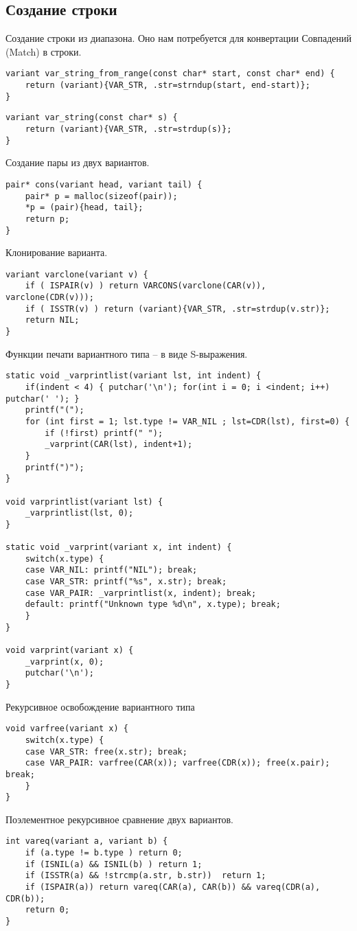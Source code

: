 \documentclass[10pt]{report}
\begin{document}
\subsection{Создание строки}
Создание строки из диапазона. Оно нам потребуется для конвертации Совпадений (Match) в строки.
\begin{lstlisting}[firstnumber=6]
variant var_string_from_range(const char* start, const char* end) {
	return (variant){VAR_STR, .str=strndup(start, end-start)};
}
\end{lstlisting}
\begin{lstlisting}[firstnumber=10]
variant var_string(const char* s) {
	return (variant){VAR_STR, .str=strdup(s)};
}
\end{lstlisting}
Создание пары из двух вариантов.
\begin{lstlisting}[firstnumber=14]
pair* cons(variant head, variant tail) {
	pair* p = malloc(sizeof(pair));
	*p = (pair){head, tail};
	return p;
}
\end{lstlisting}
Клонирование варианта.
\begin{lstlisting}[firstnumber=20]
variant varclone(variant v) {
	if ( ISPAIR(v) ) return VARCONS(varclone(CAR(v)), varclone(CDR(v)));
	if ( ISSTR(v) ) return (variant){VAR_STR, .str=strdup(v.str)};
	return NIL;
}
\end{lstlisting}
Функции печати вариантного типа  -- в виде S-выражения.
\begin{lstlisting}[firstnumber=28]
static void _varprintlist(variant lst, int indent) {
	if(indent < 4) { putchar('\n'); for(int i = 0; i <indent; i++) putchar(' '); }
	printf("(");
	for (int first = 1; lst.type != VAR_NIL ; lst=CDR(lst), first=0) {
		if (!first) printf(" ");
		_varprint(CAR(lst), indent+1);
	}
	printf(")");
}

void varprintlist(variant lst) {
	_varprintlist(lst, 0);
}

static void _varprint(variant x, int indent) {
	switch(x.type) {
	case VAR_NIL: printf("NIL"); break;
	case VAR_STR: printf("%s", x.str); break;
	case VAR_PAIR: _varprintlist(x, indent); break;
	default: printf("Unknown type %d\n", x.type); break;
	}
}

void varprint(variant x) {
	_varprint(x, 0);
	putchar('\n');
}
\end{lstlisting}
Рекурсивное освобождение вариантного типа
\begin{lstlisting}[firstnumber=58]
void varfree(variant x) {
	switch(x.type) {
	case VAR_STR: free(x.str); break;
	case VAR_PAIR: varfree(CAR(x)); varfree(CDR(x)); free(x.pair); break;
	}
}
\end{lstlisting}
Поэлементное рекурсивное сравнение двух вариантов.
\begin{lstlisting}[firstnumber=65]
int vareq(variant a, variant b) {
	if (a.type != b.type ) return 0;
	if (ISNIL(a) && ISNIL(b) ) return 1;
	if (ISSTR(a) && !strcmp(a.str, b.str))  return 1;
	if (ISPAIR(a)) return vareq(CAR(a), CAR(b)) && vareq(CDR(a), CDR(b));
	return 0;
}
\end{lstlisting}
\end{document}

